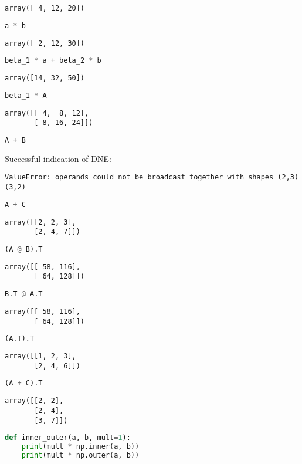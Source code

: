 \documentclass[11pt,letterpaper]{article}
\begin{document}
\begin{enumerate}
\begin{enumerate}
\begin{verbatim}
array([ 4, 12, 20])
\end{verbatim}
\begin{lstlisting}[language=python]
a * b
\end{lstlisting}
\begin{verbatim}
array([ 2, 12, 30])
\end{verbatim}
\begin{lstlisting}[language=python]
beta_1 * a + beta_2 * b
\end{lstlisting}
\begin{verbatim}
array([14, 32, 50])
\end{verbatim}
\begin{lstlisting}[language=python]
beta_1 * A
\end{lstlisting}
\begin{verbatim}
array([[ 4,  8, 12],
       [ 8, 16, 24]])
\end{verbatim}
\begin{lstlisting}[language=python]
A + B
\end{lstlisting}
Successful indication of DNE:
\begin{verbatim}
ValueError: operands could not be broadcast together with shapes (2,3) (3,2)
\end{verbatim}
\begin{lstlisting}[language=python]
A + C
\end{lstlisting}
\begin{verbatim}
array([[2, 2, 3],
       [2, 4, 7]])
\end{verbatim}
\begin{lstlisting}[language=python]
(A @ B).T
\end{lstlisting}
\begin{verbatim}
array([[ 58, 116],  
       [ 64, 128]])
\end{verbatim}
\begin{lstlisting}[language=python]
B.T @ A.T
\end{lstlisting}
\begin{verbatim}
array([[ 58, 116],
       [ 64, 128]])
\end{verbatim}
\begin{lstlisting}[language=python]
(A.T).T
\end{lstlisting}
\begin{verbatim}
array([[1, 2, 3],
       [2, 4, 6]])
\end{verbatim}
\begin{lstlisting}[language=python]
(A + C).T
\end{lstlisting}
\begin{verbatim}
array([[2, 2],
       [2, 4],
       [3, 7]])
\end{verbatim}
\begin{lstlisting}[language=python]
def inner_outer(a, b, mult=1):
    print(mult * np.inner(a, b))
    print(mult * np.outer(a, b))


\end{lstlisting}
\end{enumerate}
\end{enumerate}
\end{document}
